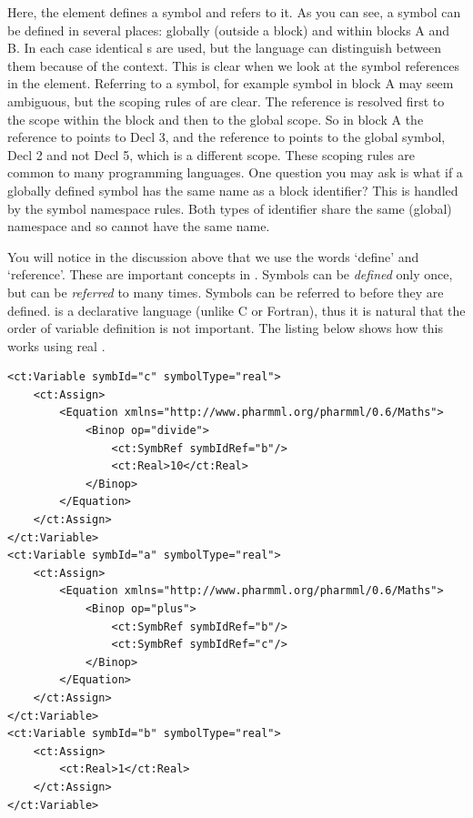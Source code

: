 Here, the  element defines a symbol and 
refers to it.  As you can see, a symbol can be defined in several
places: globally (outside a block) and within blocks A and B. In each
case identical s are used, but the language can
distinguish between them because of the context. This is clear when we
look at the symbol references in the 
element. Referring to a symbol, for example symbol  in
block A may seem ambiguous, but the scoping rules of \pharmml are
clear. The reference is resolved first to the scope within the block
and then to the global scope. So in block A the reference to
 points to Decl 3, and the reference to 
points to the global symbol, Decl 2 and not Decl 5, which is a
different scope. These scoping rules are common to many programming
languages. One question you may ask is what if a globally defined symbol
has the same name as a block identifier? This is handled by the
symbol namespace rules. Both types of identifier share the same (global)
namespace and so cannot have the same name.

You will notice in the discussion above that we use the words `define'
and `reference'. These are important concepts in \pharmml. Symbols can be
\emph{defined} only once, but can be \emph{referred} to many
times. Symbols can be referred to before they are defined. 
\pharmml is a declarative language (unlike C or Fortran), thus it is natural
that the order of variable definition is not important. The listing below
shows how this works using real \pharmml.

\lstset{language=XML}
\begin{lstlisting}
<ct:Variable symbId="c" symbolType="real">
    <ct:Assign>
        <Equation xmlns="http://www.pharmml.org/pharmml/0.6/Maths">
            <Binop op="divide">
                <ct:SymbRef symbIdRef="b"/>
                <ct:Real>10</ct:Real>
            </Binop>
        </Equation>
    </ct:Assign>
</ct:Variable>
<ct:Variable symbId="a" symbolType="real">
    <ct:Assign>
        <Equation xmlns="http://www.pharmml.org/pharmml/0.6/Maths">
            <Binop op="plus">
                <ct:SymbRef symbIdRef="b"/>
                <ct:SymbRef symbIdRef="c"/>
            </Binop>
        </Equation>
    </ct:Assign>
</ct:Variable>
<ct:Variable symbId="b" symbolType="real">
    <ct:Assign>
        <ct:Real>1</ct:Real>
    </ct:Assign>
</ct:Variable>
\end{lstlisting}

